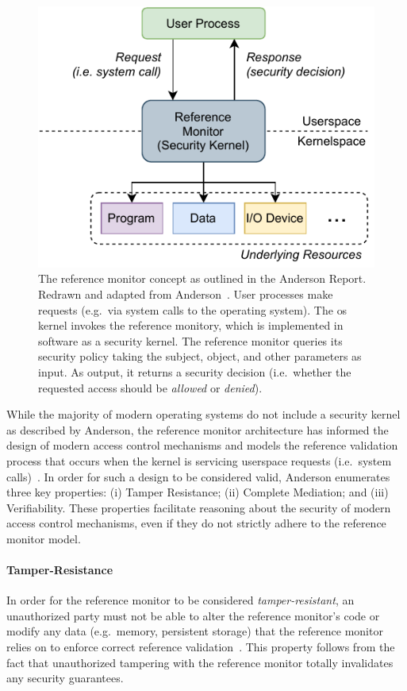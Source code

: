 \begin{figure}[htbp]
  \centering
  \includegraphics[width=0.6\linewidth]{figs/background/refmon.pdf}
  \caption[The reference monitor concept]{
    The reference monitor concept as outlined in the Anderson Report. Redrawn and adapted
    from Anderson~\cite{anderson1972_report}. User processes make requests (e.g.~via
    system calls to the operating system). The \gls{os} kernel invokes the reference
    monitory, which is implemented in software as a security kernel. The reference monitor
    queries its security policy taking the subject, object, and other parameters as input.
    As output, it returns a security decision (i.e.~whether the requested access should be
    \textit{allowed} or \textit{denied}).
  }%
  \label{fig:refmon}
\end{figure}

While the majority of modern operating systems do not include a security kernel as
described by Anderson, the reference monitor architecture has informed the design of
modern access control mechanisms and models the reference validation process that occurs
when the kernel is servicing userspace requests (i.e.~system
calls)~\cite{van_oorschot2020_tools_jewels}. In order for such a design to be considered
valid, Anderson enumerates three key properties: (i) Tamper Resistance; (ii) Complete
Mediation; and (iii) Verifiability. These properties facilitate reasoning about the
security of modern access control mechanisms, even if they do not strictly adhere to the
reference monitor model.

\paragraph*{Tamper-Resistance}

In order for the reference monitor to be considered \textit{tamper-resistant}, an unauthorized
party must not be able to alter the reference monitor's code or modify any data
(e.g.~memory, persistent storage) that the reference monitor relies on to enforce correct
reference validation~\cite{anderson1972_report}. This property follows from the fact that
unauthorized tampering with the reference monitor totally invalidates any security
guarantees.

